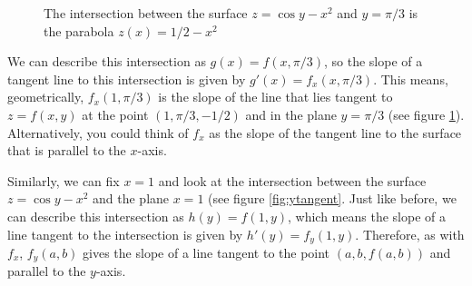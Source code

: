 \begin{figure}[htbp]
    \centering
    \caption{The intersection between the surface $z = \cos{y} - x^2$ and $y = 
    \pi/3$ is the parabola $z(x) = 1/2 - x^2$}
    \label{fig:tangent}
\end{figure}

We can describe this intersection as $g(x) = f(x, \pi/3)$, so the 
slope of a tangent line to this intersection is given by $g'(x) = f_x(x, 
\pi/3)$. This means, geometrically, $f_x(1, \pi/3)$ is the slope of the line 
that lies tangent to $z = f(x, y)$ at the point $(1, \pi/3, -1/2)$ and in the 
plane $y = \pi/3$ (see figure \ref{fig:tangent}). Alternatively, you could 
think of $f_x$ as the slope of the tangent line to the surface that is 
parallel to the $x$-axis. 

Similarly, we can fix $x = 1$ and look at the intersection between the surface 
$z = \cos{y} - x^2$ and the plane $x = 1$ (see figure \ref{fig:ytangent}. 
Just like before, we can describe this intersection as $h(y) = f(1, y)$, which 
means the slope of a line tangent to the intersection is given by $h'(y) = 
f_{y}(1, y)$. Therefore, as with $f_x$, $f_y(a, b)$ gives the slope of a line 
tangent to the point $\left(a, b, f(a, b) \right)$ and parallel to the $y$-axis. 

